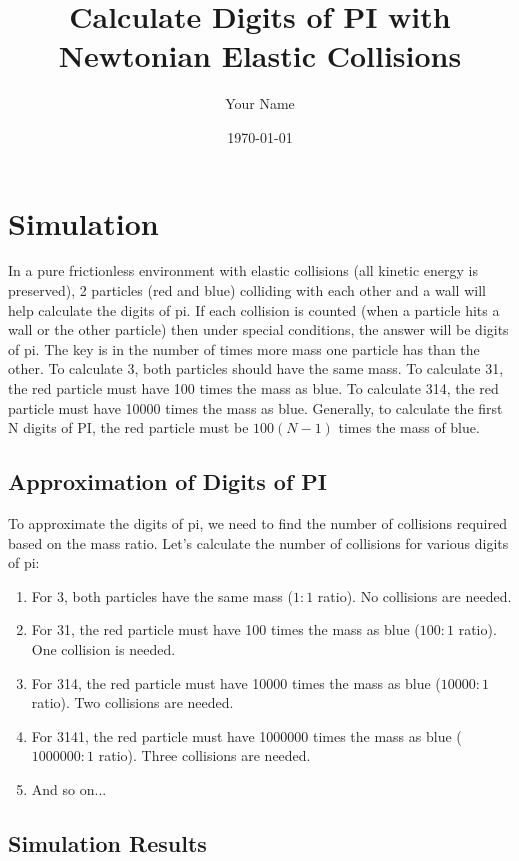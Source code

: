 \documentclass{article}
\begin{document}
\title{Calculate Digits of PI with Newtonian Elastic Collisions}
\author{Your Name}
\date{\today}
\maketitle

\section{Simulation}

In a pure frictionless environment with elastic collisions (all kinetic energy is preserved), 2 particles (red and blue) colliding with each other and a wall will help calculate the digits of pi. If each collision is counted (when a particle hits a wall or the other particle) then under special conditions, the answer will be digits of pi. The key is in the number of times more mass one particle has than the other. To calculate 3, both particles should have the same mass. To calculate 31, the red particle must have 100 times the mass as blue. To calculate 314, the red particle must have 10000 times the mass as blue. Generally, to calculate the first N digits of PI, the red particle must be $100(N-1)$ times the mass of blue.

\subsection{Approximation of Digits of PI}

To approximate the digits of pi, we need to find the number of collisions required based on the mass ratio. Let's calculate the number of collisions for various digits of pi:

\begin{enumerate}
  \item For 3, both particles have the same mass ($1:1$ ratio). No collisions are needed.
  \item For 31, the red particle must have 100 times the mass as blue ($100:1$ ratio). One collision is needed.
  \item For 314, the red particle must have 10000 times the mass as blue ($10000:1$ ratio). Two collisions are needed.
  \item For 3141, the red particle must have 1000000 times the mass as blue ($1000000:1$ ratio). Three collisions are needed.
  \item And so on...
\end{enumerate}

\subsection{Simulation Results}
\end{document}

